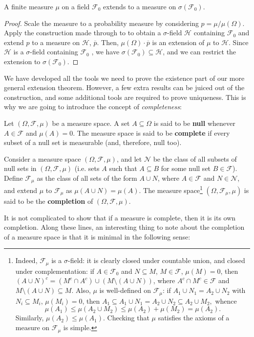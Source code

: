 \begin{thrm} A finite measure \(\mu\) on a field \(\mathcal{F}_0\) extends to a
measure on \(\sigma(\mathcal{F}_0)\).
\end{thrm}
\begin{proof} Scale the measure to a probability measure by considering
\(p=\mu/\mu(\Omega)\). Apply the construction made through  to  to obtain a
\(\sigma\)-field \(\mathcal{H}\) containing \(\mathcal{F}_{0}\) and extend \(p\) to a measure
on \(\mathcal{H}\), \(\overline{p}\). Then, \(\mu(\Omega)\cdot \overline{p}\) is an
extension of \(\mu\) to \(\mathcal{H}\). Since \(\mathcal{H}\) is a \(\sigma\)-field
containing \(\mathcal{F}_0\) , we have \(\sigma(\mathcal{F}_0)\subseteq\mathcal{H}\), and we can restrict the
extension to \(\sigma(\mathcal{F}_0)\).
\end{proof}
We have developed all the tools we need to prove the existence part of our more
general extension theorem. However, a few extra results can be juiced out of the
construction, and some additional tools are required to prove uniqueness.
This is why we are going to introduce the concept
of \textit{completeness}:
\begin{defn}\label{definition:completion of a measure space} Let \((\Omega,\mathcal{F},\mu)\) be a measure space. A set
\(A\subseteq\Omega\) is said to be \textbf{null} whenever \(A\in\mathcal{F}\) and
\(\mu(A)=0\). The measure space is said to be \textbf{complete} if every subset
of a null set is measurable (and, therefore, null too).
	
Consider a measure space \( \left(\Omega,\mathcal{F},\mu\right)\), and let \(\mathcal{N}\) be the class of all subsets of null sets in
\((\Omega,\mathcal{F},\mu)\) (i.e. sets \(A\) such that \(A\subseteq B\) for some null set \(B\in\mathcal{F}\)).
	Define \(\mathcal{F}_\mu\) as the class of all sets of the form \(A\cup N\), where
\(A\in\mathcal{F}\) and \(N\in\mathcal{N}\), and extend \(\mu\) to \(\mathcal{F}_\mu\) as
\(\mu(A\cup N)=\mu(A)\). The measure space\footnote{Indeed, \(\mathcal{F}_\mu\) is a
\(\sigma\)-field: it is clearly closed under countable union, and closed under
complementation: if \(A\in\mathcal{F}_0\) and \(N\subseteq M\), \(M\in\mathcal{F}\), \(\mu(M)=0\),
then \((A\cup N)^c=(M^c\cap A^c)\cup (M\setminus (A\cup N))\), where
\(A^c\cap M^c\in\mathcal{F}\) and \(M\setminus (A\cup N)\subseteq M\). Also, \(\mu\) is well-defined on \(\mathcal{F}_\mu\): if
\(A_1\cup N_1=A_2\cup N_2\) with \(N_i\subseteq M_i\), \(\mu(M_i)=0\), then
\(A_1\subseteq A_1\cup N_1=A_2\cup N_2\subseteq A_2\cup M_2,\) whence
\[
		\mu(A_1)\leq\mu(A_2\cup M_2)\leq\mu(A_2)+\mu(M_2)=\mu(A_2).
\]
Similarly, \(\mu(A_2)\leq\mu(A_1)\). Checking that \(\mu\) satisfies the axioms
of a measure on \(\mathcal{F}_\mu\) is simple.} \((\Omega,\mathcal{F}_\mu,\mu)\) is said to be the
\textbf{completion} of \((\Omega,\mathcal{F},\mu)\).
\end{defn}
It is not complicated to show that if a measure is complete, then it is its own completion. Along these lines, an interesting thing to note about the completion of a measure space is
that it is minimal in the following sense:

